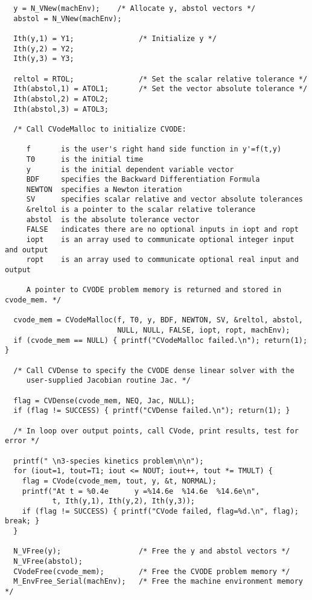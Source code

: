 \begin{verbatim}
  y = N_VNew(machEnv);    /* Allocate y, abstol vectors */
  abstol = N_VNew(machEnv); 

  Ith(y,1) = Y1;               /* Initialize y */
  Ith(y,2) = Y2;
  Ith(y,3) = Y3;

  reltol = RTOL;               /* Set the scalar relative tolerance */
  Ith(abstol,1) = ATOL1;       /* Set the vector absolute tolerance */
  Ith(abstol,2) = ATOL2;
  Ith(abstol,3) = ATOL3;

  /* Call CVodeMalloc to initialize CVODE: 

     f       is the user's right hand side function in y'=f(t,y)
     T0      is the initial time
     y       is the initial dependent variable vector
     BDF     specifies the Backward Differentiation Formula
     NEWTON  specifies a Newton iteration
     SV      specifies scalar relative and vector absolute tolerances
     &reltol is a pointer to the scalar relative tolerance
     abstol  is the absolute tolerance vector
     FALSE   indicates there are no optional inputs in iopt and ropt
     iopt    is an array used to communicate optional integer input and output
     ropt    is an array used to communicate optional real input and output

     A pointer to CVODE problem memory is returned and stored in cvode_mem. */

  cvode_mem = CVodeMalloc(f, T0, y, BDF, NEWTON, SV, &reltol, abstol,
                          NULL, NULL, FALSE, iopt, ropt, machEnv);
  if (cvode_mem == NULL) { printf("CVodeMalloc failed.\n"); return(1); }

  /* Call CVDense to specify the CVODE dense linear solver with the
     user-supplied Jacobian routine Jac. */

  flag = CVDense(cvode_mem, NEQ, Jac, NULL);
  if (flag != SUCCESS) { printf("CVDense failed.\n"); return(1); }

  /* In loop over output points, call CVode, print results, test for error */

  printf(" \n3-species kinetics problem\n\n");
  for (iout=1, tout=T1; iout <= NOUT; iout++, tout *= TMULT) {
    flag = CVode(cvode_mem, tout, y, &t, NORMAL);
    printf("At t = %0.4e      y =%14.6e  %14.6e  %14.6e\n",
           t, Ith(y,1), Ith(y,2), Ith(y,3));
    if (flag != SUCCESS) { printf("CVode failed, flag=%d.\n", flag); break; }
  }

  N_VFree(y);                  /* Free the y and abstol vectors */
  N_VFree(abstol);   
  CVodeFree(cvode_mem);        /* Free the CVODE problem memory */
  M_EnvFree_Serial(machEnv);   /* Free the machine environment memory */


\end{verbatim}
